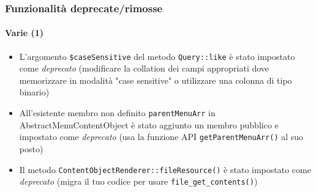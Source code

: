 \begin{frame}[fragile]
	\frametitle{Funzionalità deprecate/rimosse}
	\framesubtitle{Varie (1)}


	\begin{itemize}

		\item L'argomento \texttt{\$caseSensitive} del metodo \texttt{Query::like}
			è stato impostato come \textit{deprecato}\newline
			\smaller
				(modificare la collation dei campi appropriati dove memorizzare in modalità "case sensitive"
				o utilizzare una colonna di tipo binario)
			\normalsize

		\item All'esistente membro non definito \texttt{parentMenuArr} in AbstractMenuContentObject
			è stato aggiunto un membro pubblico e impostato come \textit{deprecato}\newline
			\smaller
				(usa la funzione API \texttt{getParentMenuArr()} al suo posto)
			\normalsize

		\item Il metodo \texttt{ContentObjectRenderer::fileResource()}
			è stato impostato come \textit{deprecato}\newline
			\smaller
				(migra il tuo codice per usare \texttt{file\_get\_contents()})
			\normalsize

	\end{itemize}

\end{frame}





